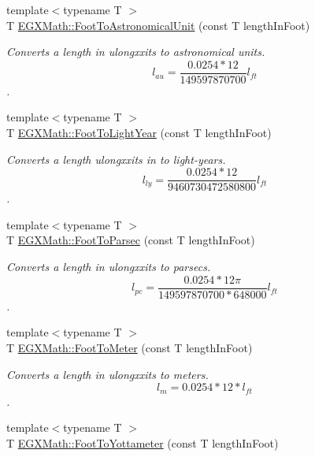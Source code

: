\begin{DoxyCompactItemize}
\item 
{\footnotesize template$<$typename T $>$ }\\T \mbox{\hyperlink{group___e_g_x_math-_conversions-_length_conversions-_imperial-_foot-_astronomical_ga18d4fb64ab846e864256de77e664033a}{E\+G\+X\+Math\+::\+Foot\+To\+Astronomical\+Unit}} (const T length\+In\+Foot)
\begin{DoxyCompactList}\small\item\em Converts a length in ulongxxits to astronomical units. \[ l_{au}=\frac{0.0254 * 12}{149597870700} l_{ft} \]. \end{DoxyCompactList}\item 
{\footnotesize template$<$typename T $>$ }\\T \mbox{\hyperlink{group___e_g_x_math-_conversions-_length_conversions-_imperial-_foot-_astronomical_gabfbad3d88e53552b7d0ed791c7d75dc7}{E\+G\+X\+Math\+::\+Foot\+To\+Light\+Year}} (const T length\+In\+Foot)
\begin{DoxyCompactList}\small\item\em Converts a length ulongxxits in to light-\/years. \[ l_{ly}=\frac{0.0254 * 12}{9460730472580800} l_{ft} \]. \end{DoxyCompactList}\item 
{\footnotesize template$<$typename T $>$ }\\T \mbox{\hyperlink{group___e_g_x_math-_conversions-_length_conversions-_imperial-_foot-_astronomical_gac6684ac6570b6ec9a0e30237bbb33f16}{E\+G\+X\+Math\+::\+Foot\+To\+Parsec}} (const T length\+In\+Foot)
\begin{DoxyCompactList}\small\item\em Converts a length in ulongxxits to parsecs. \[ l_{pc}=\frac{0.0254 * 12 \pi}{149597870700 * 648000} l_{ft} \]. \end{DoxyCompactList}\item 
{\footnotesize template$<$typename T $>$ }\\T \mbox{\hyperlink{group___e_g_x_math-_conversions-_length_conversions-_imperial-_foot-_s_i_ga6b4c99ec398edb961655516d6e7ffd9b}{E\+G\+X\+Math\+::\+Foot\+To\+Meter}} (const T length\+In\+Foot)
\begin{DoxyCompactList}\small\item\em Converts a length in ulongxxits to meters. \[ l_{m}=0.0254 * 12 * l_{ft} \]. \end{DoxyCompactList}\item 
{\footnotesize template$<$typename T $>$ }\\T \mbox{\hyperlink{group___e_g_x_math-_conversions-_length_conversions-_imperial-_foot-_s_i_ga46034464c113e5d1689c0fd573c65977}{E\+G\+X\+Math\+::\+Foot\+To\+Yottameter}} (const T length\+In\+Foot)

\end{DoxyCompactItemize}

